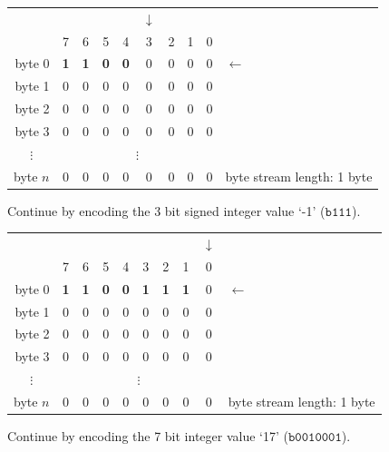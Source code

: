 \documentclass[9pt,letterpaper]{book}
\newcommand{\bin}[1]{\ensuremath{\mathtt{b#1}}}
\numberwithin{equation}{chapter}
\numberwithin{figure}{chapter}
\numberwithin{table}{chapter}
\begin{document}
\begin{tabular}{r|ccccccccl}
\multicolumn{1}{r}{}& &&&&$\downarrow$&&&& \\
         & 7 & 6 & 5 & 4 & 3 & 2 & 1 & 0 & \\\cline{1-9}
byte 0   & \textbf{1} & \textbf{1} & \textbf{0} & \textbf{0} &
                           0 & 0 & 0 & 0 & $\leftarrow$     \\
byte 1   & 0 & 0 & 0 & 0 & 0 & 0 & 0 & 0 &                  \\
byte 2   & 0 & 0 & 0 & 0 & 0 & 0 & 0 & 0 &                  \\
byte 3   & 0 & 0 & 0 & 0 & 0 & 0 & 0 & 0 &                  \\
\multicolumn{1}{c|}{$\vdots$}&\multicolumn{8}{c}{$\vdots$}& \\
byte $n$ & 0 & 0 & 0 & 0 & 0 & 0 & 0 & 0 &
byte stream length: 1 byte
\end{tabular}
\vspace{\baselineskip}

Continue by encoding the 3 bit signed integer value `-1' (\bin{111}).

\begin{tabular}{r|ccccccccl}
\multicolumn{1}{r}{} &&&&&&&&$\downarrow$& \\
         & 7 & 6 & 5 & 4 & 3 & 2 & 1 & 0 & \\\cline{1-9}
byte 0   & \textbf{1} & \textbf{1} & \textbf{0} & \textbf{0} &
           \textbf{1} & \textbf{1} & \textbf{1} & 0 & $\leftarrow$ \\
byte 1   & 0 & 0 & 0 & 0 & 0 & 0 & 0 & 0 &                         \\
byte 2   & 0 & 0 & 0 & 0 & 0 & 0 & 0 & 0 &                         \\
byte 3   & 0 & 0 & 0 & 0 & 0 & 0 & 0 & 0 &                         \\
\multicolumn{1}{c|}{$\vdots$}&\multicolumn{8}{c}{$\vdots$}&        \\
byte $n$ & 0 & 0 & 0 & 0 & 0 & 0 & 0 & 0 &
byte stream length: 1 byte
\end{tabular}
\vspace{\baselineskip}

Continue by encoding the 7 bit integer value `17' (\bin{0010001}).
\end{document}
